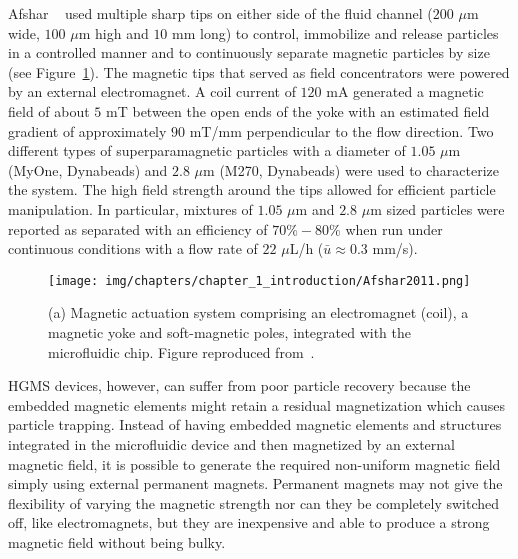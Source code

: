 Afshar \etal{}~\cite{Afshar2011} used multiple sharp tips on either side of the fluid channel ($200$ $\mu$m wide, $100$ $\mu$m high and $10$ mm long) to control, immobilize and release particles in a controlled manner and to continuously separate magnetic particles by size (see Figure~\ref{fig:Afshar2011}). The magnetic tips that served as field concentrators were powered by an external electromagnet. A coil current of $120$ mA generated a magnetic field of about $5$ mT between the open ends of the yoke with an estimated field gradient of approximately $90$ mT/mm perpendicular to the flow direction. Two different types of superparamagnetic particles with a diameter of $1.05$ $\mu$m (MyOne, Dynabeads) and $2.8$ $\mu$m (M270, Dynabeads) were used to characterize the system. The high field strength around the tips allowed for efficient particle manipulation. In particular, mixtures of $1.05$ $\mu$m and $2.8$ $\mu$m sized particles were reported as separated with an efficiency of $70\%-80\%$ when run under continuous conditions with a flow rate of $22$ $\mu$L/h ($\bar{u}\approx 0.3$ mm/s).

\begin{figure}[htb]
    \centering
	\texttt{[image: img/chapters/chapter\_1\_introduction/Afshar2011.png]}
	\caption[Microfluidic HGMS devices using an electromagnet]{(a) Magnetic actuation system comprising an electromagnet (coil), a magnetic yoke and soft-magnetic poles, integrated with the microfluidic chip. Figure reproduced from~\cite{Afshar2011}.}
	\label{fig:Afshar2011}
\end{figure}

HGMS devices, however, can suffer from poor particle recovery because the embedded magnetic elements might retain a residual magnetization which causes particle trapping. Instead of having embedded magnetic elements and structures integrated in the microfluidic device and then magnetized by an external magnetic field, it is possible to generate the required non-uniform magnetic field simply using external permanent magnets. Permanent magnets may not give the flexibility of varying the magnetic strength nor can they be completely switched off, like electromagnets, but they are inexpensive and able to produce a strong magnetic field without being bulky.

